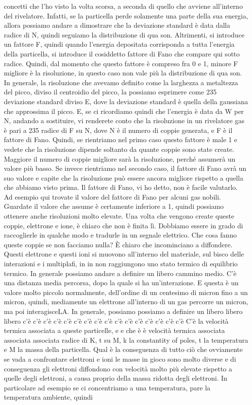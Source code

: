 {concetti che l'ho visto la volta scorsa, a seconda di quello che avviene all'interno del rivelatore. Infatti, se la particella perde solamente una parte della sua energia, allora possiamo andare a dimostrare che la deviazione standard è data dalla radice di N, quindi seguiamo la distribuzione di qua son. Altrimenti, si introduce un fattore F, quindi quando l'energia depositata corrisponda a tutta l'energia della particella, si introduce il cosiddetto fattore di Fano che compare qui sotto radice. Quindi, dal momento che questo fattore è compreso fra 0 e 1, minore F migliore è la risoluzione, in questo caso non vale più la distribuzione di qua son. In generale, la risoluzione che avevamo definito come la larghezza a metaltezza del picco, diviso il centroidio del picco, la possiamo esprimere come 235 deviazione standard diviso E, dove la deviazione standard è quella della gaussiana che approssima il picco. E, se ci ricordiamo quindi che l'energia è data da W per N, andando a sostituire, vi renderete conto che la risoluzione in un rivelatore gas è pari a 235 radice di F su N, dove N è il numero di coppie generata, e F è il fattore di Fano. Quindi, se rientriamo nel primo caso questo fattore è male 1 e vedete che la risoluzione dipende soltanto da quante coppie sono state create. Maggiore il numero di coppie migliore sarà la risoluzione, perché assumerà un valore più basso. Se invece rientriamo nel secondo caso, il fattore di Fano avrà un suo valore e capite che la risoluzione può essere ancora migliore rispetto a quella che abbiamo visto prima. Il fattore di Fano, vi ho detto, non è facile valutarlo. Ad esempio qui trovate il valore del fattore di Fano per alcuni gas nobili. Guardate il valore che assume è certamente inferiore a 1, quindi possiamo ottenere anche risoluzioni molto elevate. Una volta che vengono create queste coppie, elettrone e ione, è chiaro che non è finita lì. Dobbiamo essere in grado di raccoglierle in qualche modo e tradurle in un segnale elettrico. Che cosa fanno queste coppie se non facciamo nulla? È chiaro che incominciano a diffondere. Questi elettrone e questi ioni si muovono all'interno del materiale, sul bisco delle interazioni e i multiplafi, in in non raggiungono uno stato termico di equilibrio termico. In generale possiamo andare a definire un libero cammino medio. C'è una distanza media percorsa, dopo la quale si ha un'interazione. E questa è un valore molto piccolo normalmente, dell'ordine di un centesimo di micron fino a un micron, quindi, mediamente un elettrone all'interno di un gas percorre un micron, ma poi interagisceLA. In generale, possiamo possiamo a definire un libero libero libero c'è c'è c'è c'è c'è c'è c'è c'è c'è c'è c'è c'è c'è c'è c'è c'è C'è la velocità termica associata a queste particelle, e e che è è velocità termica associata associata associata radice di K, t su M, k la constantity of poles, t la temperatura e M la massa della particella. Qual è la conseguenza di tutto ciò che ovviamente se vada a confrontare elettroni e ioni le masse in gioco sono molto diverse e di conseguenza gli elettroni diffondono con velocità molto più elevate rispetto a quelle degli elettroni, a causa proprio della massa ridotta degli elettroni. In particolare ad esempio se ci concentriamo a una temperatura, pare la temperatura ambiente, quindi }
